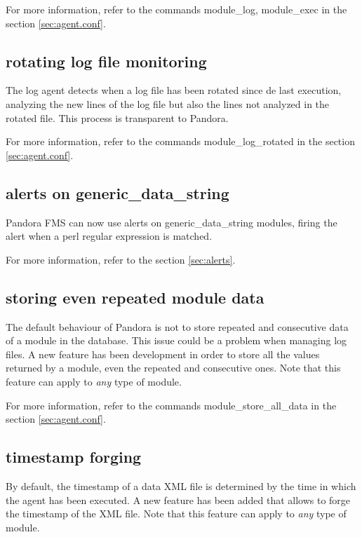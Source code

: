 \documentclass[a4paper,10pt]{article}
\begin{document}
For more information, refer to the commands  module\_log, module\_exec  in the section \ref{sec:agent.conf}.

\subsection{rotating log file monitoring}

The log agent detects when a log file has been rotated since de last execution, analyzing the new lines of the log file but also the lines not analyzed in the rotated file. This process is transparent to Pandora.

For more information, refer to the commands  module\_log\_rotated  in the section \ref{sec:agent.conf}.

\subsection{alerts on generic\_data\_string}

Pandora FMS can now use alerts on generic\_data\_string modules, firing the alert when a perl regular expression is matched.

For more information, refer to the section \ref{sec:alerts}.

\subsection{storing even repeated module data}

The default behaviour of Pandora is not to store repeated and consecutive data of a module in the database. This issue could be a problem when managing log files. A new feature has been development in order to store all the values returned by a module, even the repeated and consecutive ones. Note that this feature can apply to \emph{any} type of module.

For more information, refer to the commands  module\_store\_all\_data  in the section \ref{sec:agent.conf}.

\subsection{timestamp forging}

By default, the timestamp of a data XML file is determined by the time in which the agent has been executed. A new feature has been added that allows to forge the timestamp of the XML file. Note that this feature can apply to \emph{any} type of module.
\end{document}

